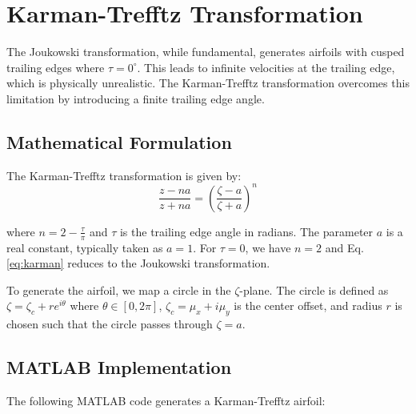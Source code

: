 \documentclass[12pt,a4paper]{article}
\begin{document}
\section{Karman-Trefftz Transformation}
The Joukowski transformation, while fundamental, generates airfoils with cusped trailing edges where $ \tau = 0^\circ $. This leads to infinite velocities at the trailing edge, which is physically unrealistic. The Karman-Trefftz transformation overcomes this limitation by introducing a finite trailing edge angle.

\subsection{Mathematical Formulation}
The Karman-Trefftz transformation is given by:
\begin{equation}
\frac{z - na}{z + na} = \left( \frac{\zeta - a}{\zeta + a} \right)^n 
\label{eq:karman}
\end{equation}

where $ n = 2 - \frac{\tau}{\pi} $ and $ \tau $ is the trailing edge angle in radians. The parameter $ a $ is a real constant, typically taken as $ a = 1 $. For $ \tau = 0 $, we have $ n = 2 $ and Eq. \ref{eq:karman} reduces to the Joukowski transformation.

To generate the airfoil, we map a circle in the $ \zeta $-plane. The circle is defined as $ \zeta = \zeta_c + r e^{i\theta} $ where $ \theta \in [0, 2\pi] $, $ \zeta_c = \mu_x + i\mu_y $ is the center offset, and radius $ r $ is chosen such that the circle passes through $ \zeta = a $.

\subsection{MATLAB Implementation}
The following MATLAB code generates a Karman-Trefftz airfoil:
\end{document}

